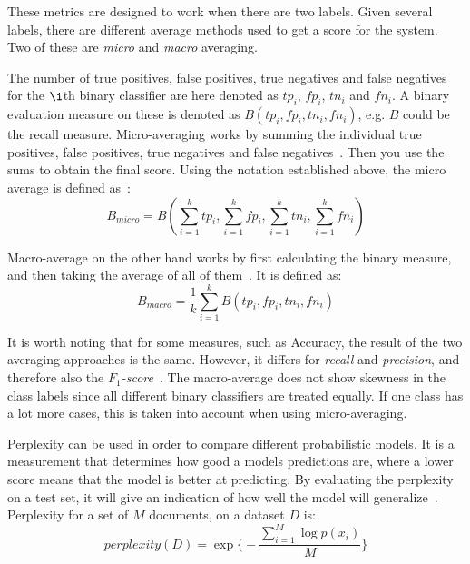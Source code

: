 These metrics are designed to work when there are two labels.
Given several labels, there are different average methods used to get a score for the system.
Two of these are \textit{micro} and \textit{macro} averaging.

The number of true positives, false positives, true negatives and false negatives for the $\i$th binary classifier are here denoted as $tp_i$, $fp_i$, $tn_i$ and $fn_i$.
A binary evaluation measure on these is denoted as $B(tp_i, fp_i, tn_i, fn_i)$, e.g. $B$ could be the recall measure.
Micro-averaging works by summing the individual true positives, false positives, true negatives and false negatives~\cite{tsoumakas2009mining}.
Then you use the sums to obtain the final score.
Using the notation established above, the micro average is defined as~\cite{tsoumakas2009mining}:
\begin{equation}
    B_{micro} = B(\sum_{i = 1}^ktp_i, \sum_{i = 1}^kfp_i, \sum_{i = 1}^ktn_i, \sum_{i = 1}^kfn_i)
\end{equation}

Macro-average on the other hand works by first calculating the binary measure, and then taking the average of all of them~\cite{tsoumakas2009mining}.
It is defined as:
\begin{equation}
    B_{macro} = \frac{1}{k}\sum_{i = 1}^kB(tp_i, fp_i, tn_i, fn_i)
\end{equation}

It is worth noting that for some measures, such as Accuracy, the result of the two averaging approaches is the same.
However, it differs for \textit{recall} and \textit{precision}, and therefore also the \textit{$F_1$-score}~\cite{tsoumakas2009mining}.
The macro-average does not show skewness in the class labels since all different binary classifiers are treated equally.
If one class has a lot more cases, this is taken into account when using micro-averaging.

Perplexity can be used in order to compare different probabilistic models. 
It is a measurement that determines how good a models predictions are, where a lower score means that the model is better at predicting.
By evaluating the perplexity on a test set, it will give an indication of how well the model will generalize~\cite{blei2003latent}.
Perplexity for a set of $M$ documents, on a dataset $D$ is:
\begin{equation}
    perplexity(D) = \exp \big \{ -\frac{\sum_{i=1}^M \log p(x_i) }{M} \big \}
\end{equation}
